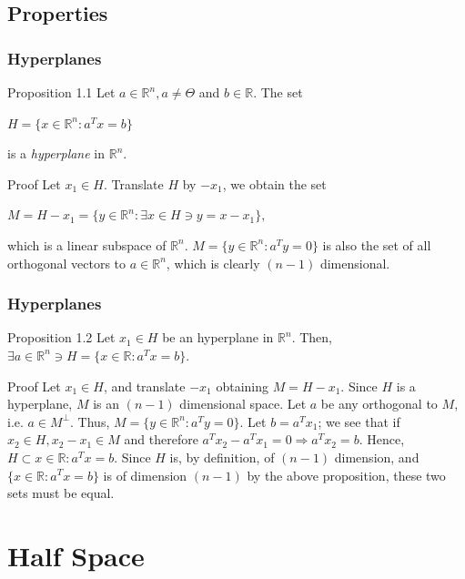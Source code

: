 \documentclass{beamer}
\begin{document}
\subsection{Properties}
\begin{frame}\frametitle{Hyperplanes}
\begin{block}{Proposition 1.1}
Let $a \in \mathbb{R}^n, a \neq \mathit{\Theta}$ and $b \in \mathbb{R}$. The set \\
\centerline{$H = \lbrace x \in \mathbb{R}^n : a^T x = b \rbrace$}
is a \textit{hyperplane} in $\mathbb{R}^n.$
\end{block}
\begin{block}{Proof}
Let $x_1 \in H$. Translate $H$ by $-x_1$, we obtain the set\\
\centerline{$M = H - x_1 = \lbrace y \in \mathbb{R}^n : \exists x \in H \ni y = x - x_1 \rbrace,$}
which is a linear subspace of $\mathbb{R}^n$. $M = \lbrace y \in \mathbb{R}^n : a^T y = 0 \rbrace$ is also the set of all orthogonal vectors to $a \in \mathbb{R}^n$, which is clearly $(n - 1)$ dimensional.
\end{block}
\end{frame}

\begin{frame}\frametitle{Hyperplanes}
\begin{block}{Proposition 1.2}
Let $x_1 \in H$ be an hyperplane in $\mathbb{R}^n$. Then, $\exists a \in \mathbb{R}^n \ni H = \lbrace x \in \mathbb{R} : a^T x = b \rbrace$.
\end{block}
\begin{block}{Proof}
Let $x_1 \in H$, and translate $-x_1$ obtaining $M = H - x_1$. Since $H$ is a hyperplane, $M$ is an $(n - 1)$ dimensional space. Let $a$ be any orthogonal to $M$, i.e. $a \in M^\bot$. Thus, $M = \lbrace y \in \mathbb{R}^n : a^T y = 0 \rbrace$. Let $b = a^T x_1$; we see that if $x_2 \in H, x_2 - x_1 \in M$ and therefore $a^T x_2 - a^T x_1 = 0 \Rightarrow a^T x_2 = b$. Hence, $H \subset x \in \mathbb{R} : a^T x = b$. Since $H$ is, by definition, of $(n - 1)$ dimension, and $\lbrace x\in \mathbb{R} : a^T x = b \rbrace$ is of dimension $(n - 1)$ by the above proposition, these two sets must be equal.
\end{block}
\end{frame}


\section{Half Space}
\end{document}
